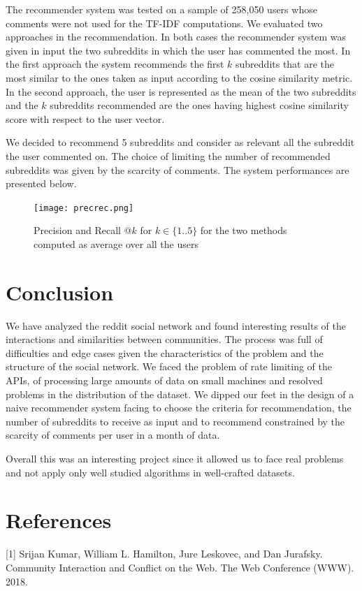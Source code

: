 \documentclass{article}
\begin{document}
The recommender system was tested on a sample of 258,050 users whose comments
were not used for the TF-IDF computations. We evaluated two approaches in the
recommendation. In both cases the recommender system was given in input the
two subreddits in which the user has commented the most. In the first approach
the system recommends the first $k$ subreddits that are the most similar to the
ones taken as input according to the cosine similarity metric. In the second
approach, the user is represented as the mean of the two subreddits and the
$k$ subreddits recommended are the ones having highest cosine similarity score
with respect to the user vector.

We decided to recommend 5 subreddits and consider as relevant all the subreddit
the user commented on. The choice of limiting the number of recommended
subreddits was given by the scarcity of comments. The system performances are
presented below.

\begin{figure}[h]
\centering
\texttt{[image: precrec.png]} \\
\caption{Precision and Recall @$k$ for $k \in \{1 .. 5\}$ for the two methods
computed as average over all the users}
\label{fig:hist}
\end{figure}

\section{Conclusion}

We have analyzed the reddit social network and found interesting results of the
interactions and similarities between communities. The process was full of
difficulties and edge cases given the characteristics of the problem and the
structure of the social network. We faced the problem of rate limiting of the
APIs, of processing large amounts of data on small machines and resolved
problems in the distribution of the dataset. We dipped our feet in the design of
a naive recommender system facing to choose the criteria for recommendation, the
number of subreddits to receive as input and to recommend constrained by the scarcity
of comments per user in a month of data.

Overall this was an interesting project since it allowed us to face real
problems and not apply only well studied algorithms in well-crafted datasets.

\section*{References}

\small

[1] Srijan Kumar, William L. Hamilton, Jure Leskovec, and Dan Jurafsky. Community Interaction and Conflict on the Web. The Web Conference (WWW). 2018.
\end{document}
